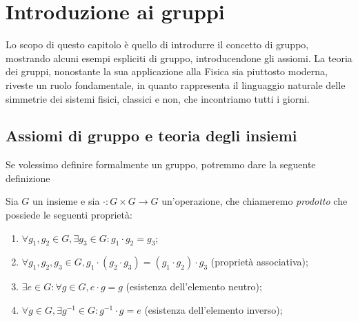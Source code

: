 \chapter{Introduzione ai gruppi}

Lo scopo di questo capitolo è quello di introdurre il concetto di gruppo, mostrando alcuni esempi espliciti di gruppo, introducendone gli assiomi. La teoria dei gruppi, nonostante la sua applicazione alla Fisica sia piuttosto moderna, riveste un ruolo fondamentale, in quanto rappresenta il linguaggio naturale delle simmetrie dei sistemi fisici, classici e non, che incontriamo tutti i giorni.

\section{Assiomi di gruppo e teoria degli insiemi}

Se volessimo definire formalmente un gruppo, potremmo dare la seguente definizione

\begin{definition}[gruppo]
	Sia $G$ un insieme e sia $\cdot: G \times G \to G$ un'operazione, che chiameremo \emph{prodotto} che possiede le seguenti proprietà:
	\begin{enumerate}
		\item $\forall g_1, g_2 \in G, \exists g_3 \in G : g_1 \cdot g_2 = g_3$;
		\item $\forall g_1, g_2, g_3 \in G, g_1 \cdot (g_2 \cdot g_3) = (g_1 \cdot g_2) \cdot g_3$ (proprietà associativa);
		\item $\exists e \in G: \forall g \in G, e \cdot g = g$ (esistenza dell'elemento neutro);
		\item $\forall g \in G, \exists g^{-1} \in G: g^{-1} \cdot g = e$ (esistenza dell'elemento inverso);
	\end{enumerate}
\end{definition}

